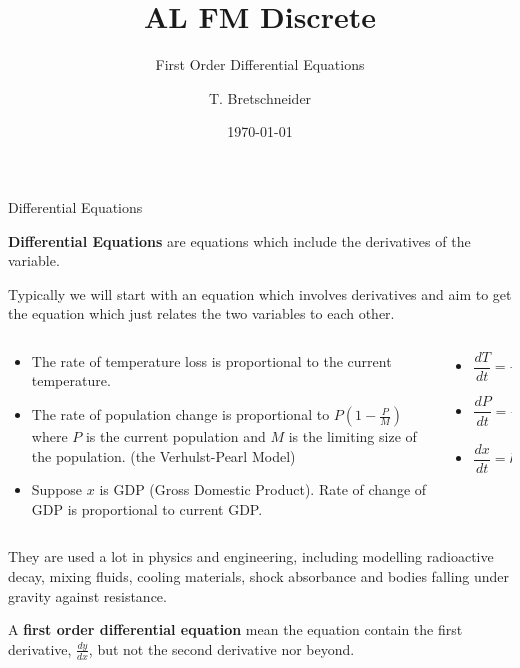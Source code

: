 \documentclass[8pt]{beamer}
\title[Discrete]{AL FM Discrete}
\subtitle{First Order Differential Equations}
\author[]{T. Bretschneider}
\date[\today]{\today}
\begin{document}
\setlength{\abovedisplayskip}{0pt}
\setlength{\belowdisplayskip}{0pt}
\setlength{\abovedisplayshortskip}{0pt}
\setlength{\belowdisplayshortskip}{0pt}


\frame{\titlepage}


\begin{frame}[shrink]{Differential Equations}
	\begin{definition}
		\textbf{Differential Equations} are equations which include the derivatives of the variable.
	\end{definition}
	\alert<1>{Typically we will start with an equation which involves derivatives and aim to get the equation which just relates the two variables to each other.}
	
		\begin{columns}
			\begin{column}{0.6\linewidth}
				\begin{example}
					\begin{itemize}
						\item The rate of temperature loss is proportional to the current temperature.
						\item The rate of population change is proportional to $P\left( 1-\frac{P}{M} \right) $ where $P$ is the current population and $M$ is the limiting size of the population. (the Verhulst-Pearl Model)
						\item Suppose $x$ is GDP (Gross Domestic Product). Rate of change of GDP is proportional to current GDP.
					\end{itemize}
				\end{example}
			\end{column}
			\begin{column}{0.4\linewidth}
				\begin{itemize}
					\item \[
					\frac{dT}{dt}=-kT
					.\] 
					\item \[
					\frac{dP}{dt}=-kP\left( 1-\frac{P}{M} \right)               
					.\] 
					\item \[                    
					\frac{dx}{dt}=kx
					.\] 
				\end{itemize}
			\end{column}	
		\end{columns}
		

	They are used a lot in physics and engineering, including modelling radioactive decay, mixing fluids, cooling materials, shock absorbance and bodies falling under gravity against resistance.
	\begin{definition}
		A \textbf{first order differential equation} mean the equation contain the first derivative, $\frac{dy}{dx}$, but not the second derivative nor beyond. 
	\end{definition}
\end{frame}
\end{document}

